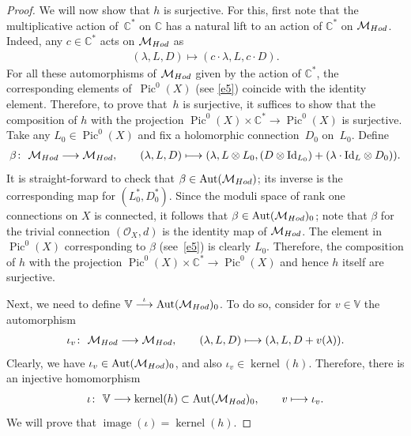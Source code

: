 \documentclass[11pt]{article}
\numberwithin{equation}{section}
\begin{document}
\begin{proof}
We will now show that $h$ is surjective. For this, f\/irst note that the multiplicative action of~${\mathbb C}^*$ on $\mathbb C$ has a natural lift to an action of ${\mathbb C}^*$ on ${\mathcal M}_{\rm Hod}$. Indeed, any $c \in {\mathbb C}^*$ acts on ${\mathcal M}_{\rm Hod}$ as
\begin{gather*}
(\lambda, L, D) \longmapsto (c\cdot\lambda, L, c\cdot D) .
\end{gather*}
For all these automorphisms of ${\mathcal M}_{\rm Hod}$ given by the action of ${\mathbb C}^*$, the corresponding elements of~$\operatorname{Pic}^0(X)$ (see \eqref{e5}) coincide with the identity element. Therefore, to prove that~$h$ is surjective, it suf\/f\/ices to show that the composition of $h$ with the projection $\operatorname{Pic}^0(X)\times {\mathbb C}^*  \longrightarrow \operatorname{Pic}^0(X)$ is surjective. Take any $L_0 \in \operatorname{Pic}^0(X)$ and f\/ix a holomorphic connection~$D_0$ on~$L_0$. Def\/ine
\begin{gather*}
\beta \colon \  {\mathcal M}_{\rm Hod} \longrightarrow {\mathcal M}_{\rm Hod} ,\qquad
(\lambda, L, D) \longmapsto (\lambda, L\otimes L_0, (D\otimes \text{Id}_{L_0}) +(\lambda\cdot \text{Id}_L\otimes D_0)) .
\end{gather*}
It is straight-forward to check that $\beta \in \operatorname{Aut}({\mathcal M}_{\rm Hod})$; its inverse is the corresponding map for $(L_0^*, D_0^*)$. Since the moduli space of rank one connections on $X$ is connected, it follows that $\beta \in \operatorname{Aut}({\mathcal M}_{\rm Hod})_0$; note that $\beta$ for the trivial connection $({\mathcal O}_X, d)$ is the identity map of ${\mathcal M}_{\rm Hod}$. The element in $\operatorname{Pic}^0(X)$ corresponding to $\beta$ (see~\eqref{e5}) is clearly $L_0$. Therefore, the composition of $h$ with the projection $\operatorname{Pic}^0(X)\times {\mathbb C}^*  \longrightarrow \operatorname{Pic}^0(X)$ and hence $h$ itself are surjective.

Next, we need to def\/ine ${\mathbb V} \stackrel{\iota}{\longrightarrow} \operatorname{Aut}({\mathcal M}_{\rm Hod})_0$. To do so, consider for $v \in \mathbb V$ the automorphism
\begin{gather}\label{e6}
\iota_v \colon \ {\mathcal M}_{\rm Hod} \longrightarrow {\mathcal M}_{\rm Hod} ,\qquad (\lambda, L, D) \longmapsto (\lambda, L, D+v(\lambda)) .
\end{gather}
Clearly, we have $\iota_v \in \operatorname{Aut}({\mathcal M}_{\rm Hod})_0$, and also $\iota_v \in \operatorname{kernel}(h)$. Therefore, there is an injective homomorphism
\begin{gather*}
\iota \colon \ {\mathbb V} \longrightarrow \operatorname{kernel}(h) \subset \operatorname{Aut}({\mathcal M}_{\rm Hod})_0 ,\qquad v \longmapsto \iota_v .
\end{gather*}
We will prove that $\operatorname{image}(\iota) = \operatorname{kernel}(h)$.


\end{proof}
\end{document}
